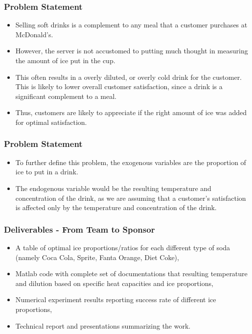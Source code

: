 \documentclass[compress,handout,10pt]{beamer}
\let\olditem\item
\renewcommand{\item}{\setlength{\itemsep}{0.5\baselineskip}\olditem}
\begin{document}
\begin{frame}
    \frametitle{Problem Statement}
     \begin{itemize}
         \item Selling soft drinks is a complement to any meal that a customer purchases at McDonald's.
\item However, the server is not accustomed to putting much thought in measuring the amount of ice put in the cup.
\item This often results in a overly diluted, or overly cold drink for the customer. This is likely to lower overall customer satisfaction, since a drink is a significant complement to a meal. 
\item Thus, customers are likely to appreciate if the right amount of ice was added for optimal satisfaction.
     \end{itemize}
\end{frame}

\begin{frame}
    \frametitle{Problem Statement}
     \begin{itemize}
      \item To further define this problem, the exogenous variables are the proportion of ice to put in a drink. 
\item The endogenous variable would be the resulting temperature and concentration of the drink, as we are assuming that a customer's satisfaction is affected only by the temperature and concentration of the drink.
     \end{itemize}
\end{frame}


\begin{frame}
    \frametitle{Deliverables - From Team to Sponsor}


\begin{itemize}
    \item A table of optimal ice proportions/ratios for each different type of soda (namely Coca Cola, Sprite, Fanta Orange, Diet Coke),
    \item Matlab code with complete set of documentations that resulting temperature and dilution based on specific heat capacities and ice proportions,
    \item Numerical experiment results reporting success rate of different ice proportions,
    \item Technical report and presentations summarizing the work. 
\end{itemize}


\end{frame}
\end{document}

